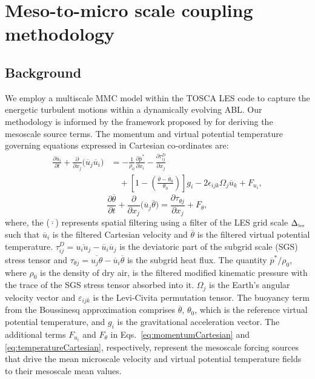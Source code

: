 \section{Meso-to-micro scale coupling methodology}
\label{sec:methods}
\subsection{\textbf{Background}}
\label{subsec:simnum}
We employ a multiscale MMC model within the TOSCA LES code \citep{stipa2023tosca} to capture the energetic turbulent motions within a dynamically evolving ABL. Our methodology is informed by the framework proposed by \cite{allaerts2020development} for deriving the mesoscale source terms. The momentum and virtual potential temperature governing equations expressed in Cartesian co-ordinates are: 
%
\begin{equation}
\begin{split}
\frac{\partial \overline{u}_i}{\partial t} + \frac{\partial}{\partial x_j}\bigl(\overline{u}_j \overline{u}_i\bigr)
&= -\frac{1}{\rho_0}\frac{\partial \overline{p}^*}{\partial x_i} 
- \frac{\partial \tau_{ij}^{D}}{\partial x_{j}} \\
&\quad  + \left[1 - \left(\frac{\overline{\theta}-\theta_0}{\theta_0}\right)\right]g_i - 2\epsilon_{ijk}\Omega_j \overline{u}_k + F_{u_i},
\end{split}
\label{eq:momentumCartesian}
\end{equation}
\begin{equation}
    \frac{\partial \overline{\theta}}{\partial t} + \frac{\partial}{\partial x_j}\bigl(\overline{u}_j \overline{\theta}\bigr)
= \frac{\partial \tau_{\theta j}}{\partial x_j} + F_{\theta} ,
\label{eq:temperatureCartesian}
\end{equation}
%
where, the ($\overline{\cdot}$) represents spatial filtering using a filter of the LES grid scale $\Delta_{\hbox{\tiny les}}$ such that $\overline{u}_i$ is the filtered Cartesian velocity and $\overline{\theta}$ is the filtered virtual potential temperature. $\tau_{i j}^D=\overline{u_i u_j}-\overline{u}_i \overline{u}_j$ is the deviatoric part of the subgrid scale (SGS) stress tensor and $\tau_{\theta j}=\overline{u_j \theta}-\overline{u}_i \overline{\theta}$ is the subgrid heat flux. The quantity $\overline{p}^*/\rho_0$, where $\rho_0$ is the density of dry air, is the filtered modified kinematic pressure with the trace of the SGS stress tensor absorbed into it. $\Omega_j$ is the Earth's angular velocity vector and $\varepsilon_{ijk}$ is the Levi-Civita permutation tensor. The buoyancy term from the Boussinesq approximation comprises $\overline{\theta}$, $\theta_0$, which is the reference virtual potential temperature, and $g_i$ is the gravitational acceleration vector. The additional terms $F_{u_i}$ and $F_{\theta}$ in Eqs.~\ref{eq:momentumCartesian} and \ref{eq:temperatureCartesian}, respectively, represent the mesoscale forcing sources that drive the mean microscale velocity and virtual potential temperature fields to their mesoscale mean values. 

